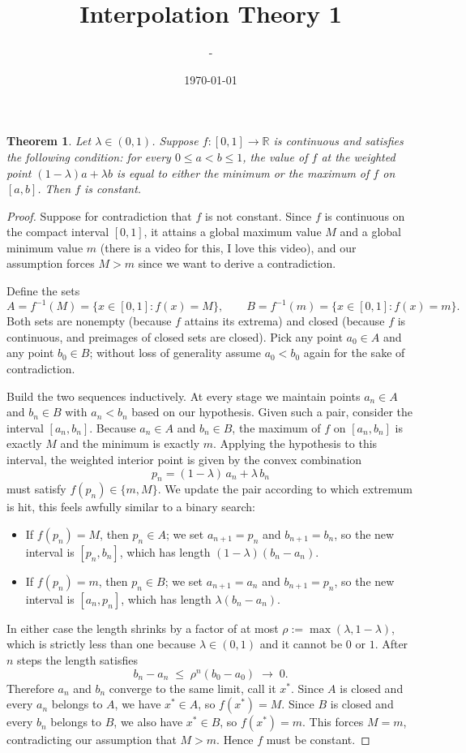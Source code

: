 \documentclass[12pt]{article}
\title{Interpolation Theory 1}
\author{-}
\date{\today}
\newtheorem{theorem}{Theorem}
\begin{document}
\maketitle


\begin{theorem}
Let $\lambda \in (0,1)$. Suppose $f : [0,1] \to \mathbb{R}$ is continuous and
satisfies the following condition: for every $0 \le a < b \le 1$, the value
of $f$ at the weighted point $(1-\lambda)a + \lambda b$ is equal to either
the minimum or the maximum of $f$ on $[a,b]$. Then $f$ is constant.
\end{theorem}

\begin{proof}
Suppose for contradiction that $f$ is not constant. Since $f$ is continuous
on the compact interval $[0,1]$, it attains a global maximum value $M$ and a
global minimum value $m$ (there is a video for this, I love this video), and our assumption forces $M > m$ since we want to derive a contradiction.

Define the sets
\[
  A = f^{-1}(M) = \{x \in [0,1] : f(x) = M\},
  \qquad
  B = f^{-1}(m) = \{x \in [0,1] : f(x) = m\}.
\]
Both sets are nonempty (because $f$ attains its extrema) and closed (because
$f$ is continuous, and preimages of closed sets are closed). Pick any point $a_0 \in A$ and any point $b_0 \in B$;
without loss of generality assume $a_0 < b_0$ again for the sake of contradiction.

Build the two sequences inductively. At every stage we maintain points
$a_n \in A$ and $b_n \in B$ with $a_n < b_n$ based on our hypothesis. Given such a pair, consider
the interval $[a_n, b_n]$. Because $a_n \in A$ and $b_n \in B$, the maximum
of $f$ on $[a_n, b_n]$ is exactly $M$ and the minimum is exactly $m$.
Applying the hypothesis to this interval, the weighted interior point is given by the convex combination
\[
  p_n = (1-\lambda)\,a_n + \lambda\,b_n
\]
must satisfy $f(p_n) \in \{m, M\}$. We update the pair according to which
extremum is hit, this feels awfully similar to a binary search:
\begin{itemize}
  \item If $f(p_n) = M$, then $p_n \in A$; we set $a_{n+1} = p_n$ and
        $b_{n+1} = b_n$, so the new interval is $[p_n, b_n]$, which has
        length $(1-\lambda)(b_n - a_n)$.
  \item If $f(p_n) = m$, then $p_n \in B$; we set $a_{n+1} = a_n$ and
        $b_{n+1} = p_n$, so the new interval is $[a_n, p_n]$, which has
        length $\lambda(b_n - a_n)$.
\end{itemize}
In either case the length shrinks by a factor of at most
$\rho := \max(\lambda, 1-\lambda)$, which is strictly less than one because
$\lambda \in (0,1)$ and it cannot be $0$ or $1$. After $n$ steps the length satisfies
\[
  b_n - a_n \;\le\; \rho^n (b_0 - a_0) \;\longrightarrow\; 0.
\]
Therefore $a_n$ and $b_n$ converge to the same limit, call it $x^*$.
Since $A$ is closed and every $a_n$ belongs to $A$, we have $x^* \in A$,
so $f(x^*) = M$. Since $B$ is closed and every $b_n$ belongs to $B$, we
also have $x^* \in B$, so $f(x^*) = m$. This forces $M = m$, contradicting
our assumption that $M > m$. Hence $f$ must be constant.
\end{proof}
\end{document}
